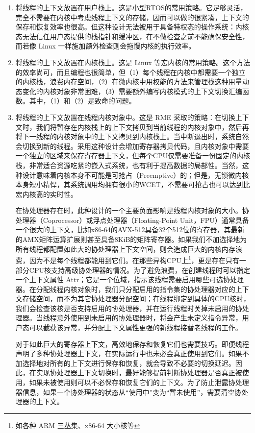 \begin{enumerate}
\def\labelenumi{\arabic{enumi}.}
\item
  将线程的上下文放置在用户栈上。这是小型RTOS的常用策略。它足够灵活，完全不需要在内核中考虑线程上下文的存储，因而可以做的很紧凑，上下文的保存和恢复效率也很高。但这种设计无法被用于具备特权态的操作系统：内核态无法信任用户态提供的栈指针和缓冲区，在不做检查之前不能确保安全性，而若像 Linux 一样施加额外检查则会拖慢内核的执行效率。
\item
  将线程的上下文放置在内核栈上。这是 Linux 等宏内核的常用策略。这个方法的效率尚可，而且编程也很简单，但（1）每个线程在内核中都需要一个独立的内核栈，浪费内存空间，（2）在微内核中用权能的方法来管理栈这种用量动态变化的内核对象非常困难，（3）需要额外编写内核模式的上下文切换汇编函数。其中，（1）和（2）是致命的问题。
\item
  将线程的上下文放置在线程内核对象中。这是 RME 采取的策略：在切换上下文时，我们将暂存在内核栈上的上下文拷贝到当前线程的内核对象中，然后再将下一线程的内核对象中的上下文拷贝到内核栈上。当中断退出时，系统自然会切换到新的线程。采用这种设计会增加寄存器拷贝代码，且内核对象中需要一个独立的区域来保存寄存器上下文，但每个CPU仅需要准备一份固定的内核栈，非常适合资源吃紧的嵌入式系统，也有利于提高数据的局部性。当然，这种设计意味着内核本身不可能是可抢占（Preemptive）的；但是，无锁微内核本身短小精悍，其系统调用均拥有很小的WCET，不需要可抢占也可以达到比宏内核高的实时性。

  在协处理器存在时，此种设计的一个主要负面影响是线程内核对象的大小。协处理器（Coprocessor）或浮点处理器（Floating-Point
  Unit，FPU）通常具备一个很大的上下文，比如x86-64的AVX-512具备32个512位的寄存器，其最新的AMX矩阵运算扩展则甚至具备8KiB的矩阵寄存器。如果我们不加选择地为所有线程都配置如此大的协处理器上下文空间，则会造成巨大的内核内存浪费，因为不是每个线程都能用到它们。在那些异构CPU上\footnote{如各种 ARM 三丛集、x86-64 大小核等}，更是存在只有一部分CPU核支持高级协处理器的情况。为了避免浪费，在创建线程时可以指定一个上下文属性 Attr；它是一个位域，指示该线程需要启用哪些可选协处理器。在分配线程内核对象时，我们只分配启用的指令集的协处理器对应的上下文存储空间，而不为其它协处理器分配空间；在线程绑定到具体的CPU核时，我们会检查该核是否支持启用的协处理器，并在运行线程时关掉未启用的协处理器。当线程意外使用到未启用的协处理器时，将会产生未定义指令异常，用户态可以截获该异常，并分配上下文属性更强的新线程接替老线程的工作。

  对于如此巨大的寄存器上下文，高效地保存和恢复它们也需要技巧。即便线程声明了多种协处理器上下文，在实际运行中也未必会真正使用到它们。如果不加选择地对所有的上下文进行保存和恢复，就会导致不必要的切换延迟。因此，在实现协处理器上下文切换时，最好能够提前判断协处理器是否真正被使用，如果未被使用则可以不必保存和恢复它们的上下文。为了防止泄露协处理器信息，如果一个协处理器的状态从``使用中''变为``暂未使用''，需要清空协处理器的上下文。


\end{enumerate}
